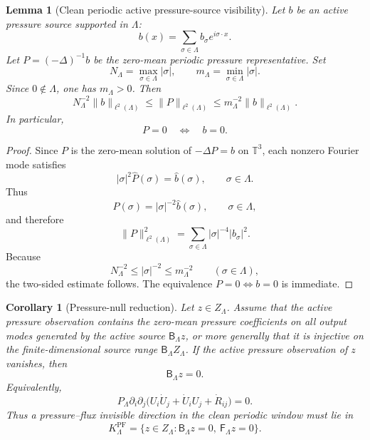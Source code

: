 \documentclass[11pt]{article}
\numberwithin{equation}{section}
\theoremstyle{plain}
\newtheorem{lemma}[theorem]{Lemma}
\newtheorem{corollary}[theorem]{Corollary}
\theoremstyle{definition}
\theoremstyle{remark}
\newcommand{\T}{\mathbb T}
\newcommand{\PF}{\mathrm{PF}}
\newcommand{\Bop}{\mathsf B}
\newcommand{\Fop}{\mathsf F}
\begin{document}
\begin{lemma}[Clean periodic active pressure-source visibility]
\label{lem:clean-periodic-pressure-source-visibility}
Let \(b\) be an active pressure source supported in \(\Lambda\):
\[
        b(x)=\sum_{\sigma\in\Lambda} b_\sigma e^{i\sigma\cdot x}.
\]
Let \(P=(-\Delta)^{-1}b\) be the zero-mean periodic pressure representative.  Set
\[
        N_\Lambda=\max_{\sigma\in\Lambda}|\sigma|,
        \qquad
        m_\Lambda=\min_{\sigma\in\Lambda}|\sigma|.
\]
Since \(0\notin\Lambda\), one has \(m_\Lambda>0\).  Then
\begin{equation}
        N_\Lambda^{-2}\|b\|_{\ell^2(\Lambda)}
        \le
        \|P\|_{\ell^2(\Lambda)}
        \le
        m_\Lambda^{-2}\|b\|_{\ell^2(\Lambda)}.
        \label{eq:pressure-source-visibility}
\end{equation}
In particular,
\[
        P=0
        \quad\Longleftrightarrow\quad
        b=0.
\]
\end{lemma}

\begin{proof}
Since \(P\) is the zero-mean solution of \(-\Delta P=b\) on \(\T^3\), each nonzero Fourier mode satisfies
\[
        |\sigma|^2\widehat P(\sigma)=\widehat b(\sigma),
        \qquad \sigma\in\Lambda.
\]
Thus
\[
        \widehat P(\sigma)=|\sigma|^{-2}\widehat b(\sigma),
        \qquad \sigma\in\Lambda,
\]
and therefore
\[
        \|P\|_{\ell^2(\Lambda)}^2
        =
        \sum_{\sigma\in\Lambda}|\sigma|^{-4}|b_\sigma|^2.
\]
Because
\[
        N_\Lambda^{-2}\le |\sigma|^{-2}\le m_\Lambda^{-2}
        \qquad(\sigma\in\Lambda),
\]
the two-sided estimate follows.  The equivalence \(P=0\Longleftrightarrow b=0\) is immediate.
\end{proof}


\begin{corollary}[Pressure-null reduction]
\label{cor:pressure-null-reduction-clean-periodic}
Let \(z\in Z_\Lambda\).  Assume that the active pressure observation contains the
zero-mean pressure coefficients on all output modes generated by the active
source \(\Bop_\Lambda z\), or more generally that it is injective on the
finite-dimensional source range \(\Bop_\Lambda Z_\Lambda\).  If the active
pressure observation of \(z\) vanishes, then
\[
        \Bop_\Lambda z=0.
\]
Equivalently,
\[
        P_\Lambda\partial_i\partial_j
        \bigl(U_i\dot U_j+\dot U_iU_j+\dot R_{ij}\bigr)=0.
\]
Thus a pressure--flux invisible direction in the clean periodic window must lie in
\[
        K^{\PF}_\Lambda
        =
        \{z\in Z_\Lambda:\Bop_\Lambda z=0,\ \Fop_\Lambda z=0\}.
\]
\end{corollary}
\end{document}
